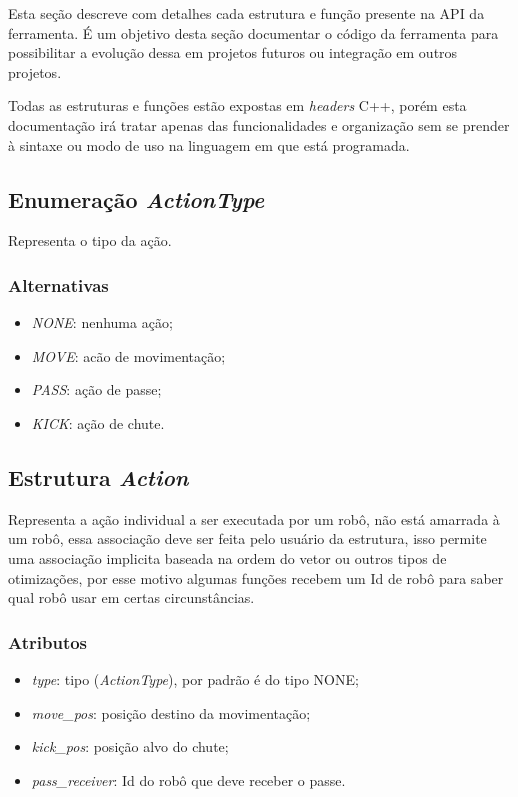 Esta seção descreve com detalhes cada estrutura e função presente na API da
ferramenta.  É um objetivo desta seção documentar o código da ferramenta para
possibilitar a evolução dessa em projetos futuros ou integração em outros
projetos.

Todas as estruturas e funções estão expostas em \textit{headers} C++, porém esta
documentação irá tratar apenas das funcionalidades e organização sem  se prender
à sintaxe ou modo de uso na linguagem em que está programada.

\subsection*{Enumeração \textit{ActionType}}

Representa o tipo da ação.

\subsubsection*{Alternativas}

\begin{itemize}
  \item \textit{NONE}: nenhuma ação;
  \item \textit{MOVE}: acão de movimentação;
  \item \textit{PASS}: ação de passe;
  \item \textit{KICK}: ação de chute.
\end{itemize}

\subsection*{Estrutura \textit{Action}}

Representa a ação individual a ser executada por um robô, não está amarrada à um
robô, essa associação deve ser feita pelo usuário da estrutura, isso permite uma
associação implicita baseada na ordem do vetor ou outros tipos de otimizações,
por esse motivo algumas funções recebem um Id de robô para saber qual robô usar
em certas circunstâncias.

\subsubsection*{Atributos}

\begin{itemize}
  \item \textit{type}: tipo (\textit{ActionType}), por padrão é do tipo NONE;
  \item \textit{move_pos}: posição destino da movimentação;
  \item \textit{kick_pos}: posição alvo do chute;
  \item \textit{pass_receiver}: Id do robô que deve receber o passe.
\end{itemize}

